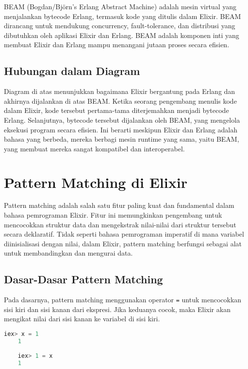 BEAM (Bogdan/Björn's Erlang Abstract Machine) adalah mesin virtual yang menjalankan bytecode Erlang, termasuk kode yang ditulis dalam Elixir. BEAM dirancang untuk mendukung concurrency, fault-tolerance, dan distribusi yang dibutuhkan oleh aplikasi Elixir dan Erlang. BEAM adalah komponen inti yang membuat Elixir dan Erlang mampu menangani jutaan proses secara efisien.

\subsection{Hubungan dalam Diagram}

Diagram di atas menunjukkan bagaimana Elixir bergantung pada Erlang dan akhirnya dijalankan di atas BEAM. Ketika seorang pengembang menulis kode dalam Elixir, kode tersebut pertama-tama diterjemahkan menjadi bytecode Erlang. Selanjutnya, bytecode tersebut dijalankan oleh BEAM, yang mengelola eksekusi program secara efisien. Ini berarti meskipun Elixir dan Erlang adalah bahasa yang berbeda, mereka berbagi mesin runtime yang sama, yaitu BEAM, yang membuat mereka sangat kompatibel dan interoperabel.

\section{Pattern Matching di Elixir}

Pattern matching adalah salah satu fitur paling kuat dan fundamental dalam bahasa pemrograman Elixir. Fitur ini memungkinkan pengembang untuk mencocokkan struktur data dan mengekstrak nilai-nilai dari struktur tersebut secara deklaratif. Tidak seperti bahasa pemrograman imperatif di mana variabel diinisialisasi dengan nilai, dalam Elixir, pattern matching berfungsi sebagai alat untuk membandingkan dan mengurai data.

\subsection{Dasar-Dasar Pattern Matching}

Pada dasarnya, pattern matching menggunakan operator \texttt{=} untuk mencocokkan sisi kiri dan sisi kanan dari ekspresi. Jika keduanya cocok, maka Elixir akan mengikat nilai dari sisi kanan ke variabel di sisi kiri.

\begin{lstlisting}[language=Elixir]
	iex> x = 1
	1
	
	iex> 1 = x
	1
\end{lstlisting}

